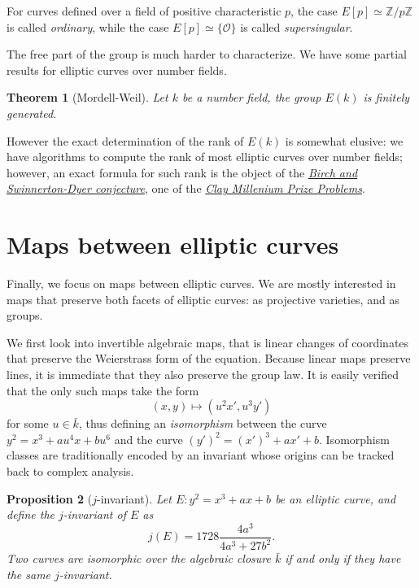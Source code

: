 \documentclass[10pt]{article}
\theoremstyle{plain}
\newtheorem{theorem}{Theorem}
\newtheorem{proposition}[theorem]{Proposition}
\theoremstyle{definition}
\def\O{\ensuremath{\mathcal{O}}}
\begin{document}
For curves defined over a field of positive characteristic $p$, the
case $E[p]≃ℤ/pℤ$ is called \emph{ordinary}, while the case
$E[p]≃\{\O\}$ is called \emph{supersingular}.

The free part of the group is much harder to characterize. %
We have some partial results for elliptic curves over number fields.

\begin{theorem}[Mordell-Weil]
  Let $k$ be a number field, the group $E(k)$ is finitely generated.
\end{theorem}

However the exact determination of the rank of $E(k)$ is somewhat
elusive: we have algorithms to compute the rank of most elliptic
curves over number fields; however, an exact formula for such rank is
the object of the
\href{https://en.wikipedia.org/wiki/Birch_and_Swinnerton-Dyer_conjecture}{\it
  Birch and Swinnerton-Dyer conjecture}, one of the
\href{https://en.wikipedia.org/wiki/Millennium_Prize_Problems}{\it
  Clay Millenium Prize Problems}.

\section{Maps between elliptic curves}

Finally, we focus on maps between elliptic curves. %
We are mostly interested in maps that preserve both facets of elliptic
curves: as projective varieties, and as groups. %

We first look into invertible algebraic maps, that is linear changes
of coordinates that preserve the Weierstrass form of the equation. %
Because linear maps preserve lines, it is immediate that they also
preserve the group law. %
It is easily verified that the only such maps take the form
\[(x,y) \mapsto (u^2x', u^3y')\] %
for some $u∈\bar{k}$, thus defining an \emph{isomorphism} between the
curve $y^2=x^3+au^4x+bu^6$ and the curve $(y')^2 = (x')^3 + ax' +
b$. %
Isomorphism classes are traditionally encoded by an invariant whose
origins can be tracked back to complex analysis.

\begin{proposition}[$j$-invariant]
  \label{th:j}
  Let $E:y^2=x^3+ax+b$ be an elliptic curve, and define the
  \emph{$j$-invariant} of $E$ as
  \[j(E) = 1728\frac{4a^3}{4a^3+27b^2}.\] %
  Two curves are isomorphic over the algebraic closure $\bar{k}$ if
  and only if they have the same $j$-invariant.
\end{proposition}
\end{document}
